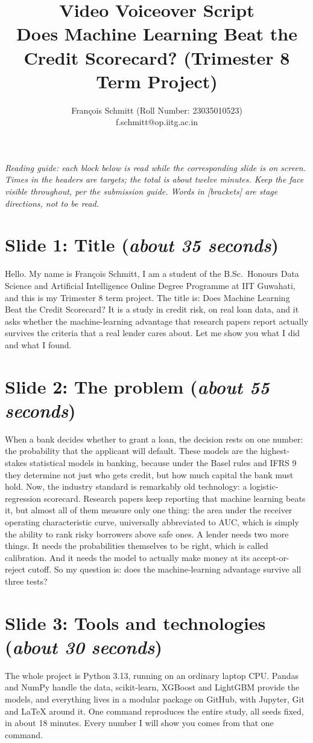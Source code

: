 \documentclass[a4paper,11pt]{article}
\title{\bfseries Video Voiceover Script\\
\large Does Machine Learning Beat the Credit Scorecard? (Trimester 8 Term Project)}
\author{François Schmitt (Roll Number: 23035010523)\\
\ttfamily f.schmitt@op.iitg.ac.in}
\date{}
\newcommand{\slideblock}[3]{%
  \section*{Slide #1: #2 \hfill \normalfont\small(\textit{#3})}}
\begin{document}
\maketitle

\noindent\textit{Reading guide: each block below is read while the corresponding slide is on screen. Times in the headers are targets; the total is about twelve minutes. Keep the face visible throughout, per the submission guide. Words in [brackets] are stage directions, not to be read.}

\slideblock{1}{Title}{about 35 seconds}
Hello. My name is François Schmitt, I am a student of the B.Sc.\ Honours Data Science and Artificial Intelligence Online Degree Programme at IIT Guwahati, and this is my Trimester 8 term project. The title is: Does Machine Learning Beat the Credit Scorecard? It is a study in credit risk, on real loan data, and it asks whether the machine-learning advantage that research papers report actually survives the criteria that a real lender cares about. Let me show you what I did and what I found.

\slideblock{2}{The problem}{about 55 seconds}
When a bank decides whether to grant a loan, the decision rests on one number: the probability that the applicant will default. These models are the highest-stakes statistical models in banking, because under the Basel rules and IFRS 9 they determine not just who gets credit, but how much capital the bank must hold. Now, the industry standard is remarkably old technology: a logistic-regression scorecard. Research papers keep reporting that machine learning beats it, but almost all of them measure only one thing: the area under the receiver operating characteristic curve, universally abbreviated to AUC, which is simply the ability to rank risky borrowers above safe ones. A lender needs two more things. It needs the probabilities themselves to be right, which is called calibration. And it needs the model to actually make money at its accept-or-reject cutoff. So my question is: does the machine-learning advantage survive all three tests?

\slideblock{3}{Tools and technologies}{about 30 seconds}
The whole project is Python 3.13, running on an ordinary laptop CPU. Pandas and NumPy handle the data, scikit-learn, XGBoost and LightGBM provide the models, and everything lives in a modular package on GitHub, with Jupyter, Git and LaTeX around it. One command reproduces the entire study, all seeds fixed, in about 18 minutes. Every number I will show you comes from that one command.
\end{document}

